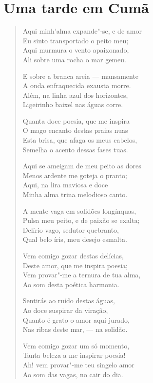 \chapter{Uma tarde em Cumã}

\begin{verse}
Aqui minh'alma expande"-se, e de amor\\
Eu sinto transportado o peito meu;\\
Aqui murmura o vento apaixonado,\\
Ali sobre uma rocha o mar gemeu.

E sobre a branca areia --- mansamente\\
A onda enfraquecida exausta morre.\\
Além, na linha azul dos horizontes,\\
Ligeirinho baixel nas águas corre.

Quanta doce poesia, que me inspira\\
O mago encanto destas praias nuas\\
Esta brisa, que afaga os meus cabelos,\\
Semelha o acento dessas fases tuas.

Aqui se ameigam de meu peito as dores\\
Menos ardente me goteja o pranto;\\
Aqui, na lira maviosa e doce\\
Minha alma trina melodioso canto.

A mente vaga em solidões longínquas,\\
Pulsa meu peito, e de paixão se exalta;\\
Delírio vago, sedutor quebranto,\\
Qual belo íris, meu desejo esmalta.

Vem comigo gozar destas delícias,\\
Deste amor, que me inspira poesia;\\
Vem provar"-me a ternura de tua alma,\\
Ao som desta poética harmonia.

Sentirás ao ruído destas águas,\\
Ao doce suspirar da viração,\\
Quanto é grato o amor aqui jurado,\\
Nas ribas deste mar, --- na solidão.

Vem comigo gozar um só momento,\\
Tanta beleza a me inspirar poesia!\\
Ah! vem provar"-me teu singelo amor\\
Ao som das vagas, no cair do dia.
\end{verse}

